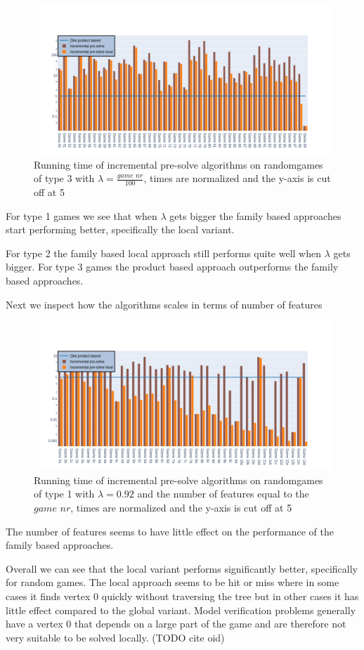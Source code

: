 \begin{figure}[H]
	\includegraphics[width=1\linewidth]{"results/BC_randomgames/Zlnk product based_Incremental pre-solve_Incremental pre-solve local_"}
	\caption{Running time of incremental pre-solve algorithms on randomgames of type 3 with $\lambda = \frac{\textit{game nr}}{100}$, times are normalized and the y-axis is cut off at 5}
	\label{fig:elevatorzlnks}
\end{figure}%
For type 1 games we see that when $\lambda$ gets bigger the family based approaches start performing better, specifically the local variant.

For type 2 the family based local approach still performs quite well when $\lambda$ gets bigger. For type 3 games the product based approach outperforms the family based approaches.

Next we inspect how the algorithms scales in terms of number of features
\begin{figure}[H]
	\includegraphics[width=1\linewidth]{"results/randomscalegames/Zlnk product based_Incremental pre-solve_Incremental pre-solve local_"}
	\caption{Running time of incremental pre-solve algorithms on randomgames of type 1 with $\lambda = 0.92$ and the number of features equal to the $\textit{game nr}$, times are normalized and the y-axis is cut off at 5}
	\label{fig:elevatorzlnks}
\end{figure}%
The number of features seems to have little effect on the performance of the family based approaches.

Overall we can see that the local variant performs significantly better, specifically for random games. The local approach seems to be hit or miss where in some cases it finds vertex $0$ quickly without traversing the tree but in other cases it has little effect compared to the global variant. Model verification problems generally have a vertex $0$ that depends on a large part of the game and are therefore not very suitable to be solved locally. (TODO cite oid)